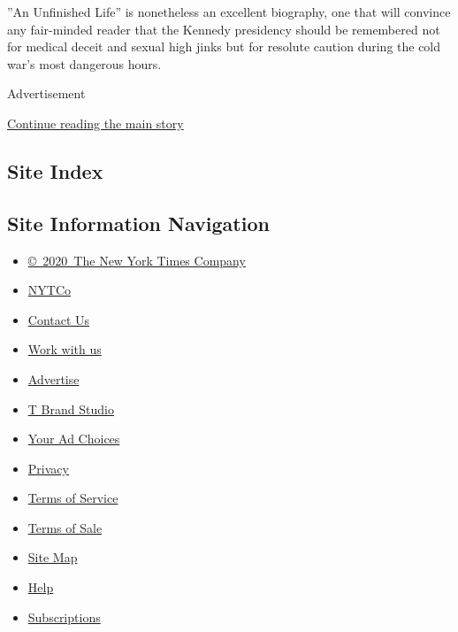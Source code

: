 ''An Unfinished Life'' is nonetheless an excellent biography, one that
will convince any fair-minded reader that the Kennedy presidency should
be remembered not for medical deceit and sexual high jinks but for
resolute caution during the cold war's most dangerous hours.

Advertisement

\protect\hyperlink{after-bottom}{Continue reading the main story}

\hypertarget{site-index}{%
\subsection{Site Index}\label{site-index}}

\hypertarget{site-information-navigation}{%
\subsection{Site Information
Navigation}\label{site-information-navigation}}

\begin{itemize}
\tightlist
\item
  \href{https://help.nytimes3xbfgragh.onion/hc/en-us/articles/115014792127-Copyright-notice}{©~2020~The
  New York Times Company}
\end{itemize}

\begin{itemize}
\tightlist
\item
  \href{https://www.nytco.com/}{NYTCo}
\item
  \href{https://help.nytimes3xbfgragh.onion/hc/en-us/articles/115015385887-Contact-Us}{Contact
  Us}
\item
  \href{https://www.nytco.com/careers/}{Work with us}
\item
  \href{https://nytmediakit.com/}{Advertise}
\item
  \href{http://www.tbrandstudio.com/}{T Brand Studio}
\item
  \href{https://www.nytimes3xbfgragh.onion/privacy/cookie-policy\#how-do-i-manage-trackers}{Your
  Ad Choices}
\item
  \href{https://www.nytimes3xbfgragh.onion/privacy}{Privacy}
\item
  \href{https://help.nytimes3xbfgragh.onion/hc/en-us/articles/115014893428-Terms-of-service}{Terms
  of Service}
\item
  \href{https://help.nytimes3xbfgragh.onion/hc/en-us/articles/115014893968-Terms-of-sale}{Terms
  of Sale}
\item
  \href{https://spiderbites.nytimes3xbfgragh.onion}{Site Map}
\item
  \href{https://help.nytimes3xbfgragh.onion/hc/en-us}{Help}
\item
  \href{https://www.nytimes3xbfgragh.onion/subscription?campaignId=37WXW}{Subscriptions}
\end{itemize}
